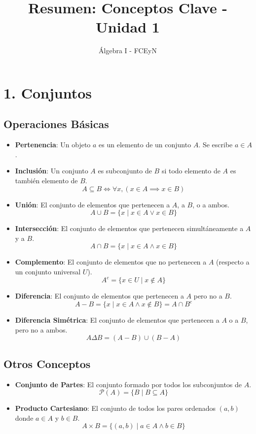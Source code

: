 \documentclass{article}
\title{\textbf{Resumen: Conceptos Clave - Unidad 1}}
\author{Álgebra I - FCEyN}
\date{}
\begin{document}
\maketitle

\section*{1. Conjuntos}

\subsection*{Operaciones B\'{a}sicas}
\begin{itemize}
    \item \textbf{Pertenencia}: Un objeto $a$ es un elemento de un conjunto $A$. Se escribe $a \in A$.
    \item \textbf{Inclusi\'{o}n}: Un conjunto $A$ es subconjunto de $B$ si todo elemento de $A$ es tambi\'{e}n elemento de $B$.
    \[ A \subseteq B \iff \forall x, (x \in A \implies x \in B) \]
    \item \textbf{Uni\'{o}n}: El conjunto de elementos que pertenecen a $A$, a $B$, o a ambos.
    \[ A \cup B = \{x \mid x \in A \lor x \in B\} \]
    \item \textbf{Intersecci\'{o}n}: El conjunto de elementos que pertenecen simult\'{a}neamente a $A$ y a $B$.
    \[ A \cap B = \{x \mid x \in A \land x \in B\} \]
    \item \textbf{Complemento}: El conjunto de elementos que no pertenecen a $A$ (respecto a un conjunto universal $U$).
    \[ A^c = \{x \in U \mid x \notin A\} \]
    \item \textbf{Diferencia}: El conjunto de elementos que pertenecen a $A$ pero no a $B$.
    \[ A - B = \{x \mid x \in A \land x \notin B\} = A \cap B^c \]
    \item \textbf{Diferencia Sim\'{e}trica}: El conjunto de elementos que pertenecen a $A$ o a $B$, pero no a ambos.
    \[ A \Delta B = (A - B) \cup (B - A) \]
\end{itemize}

\subsection*{Otros Conceptos}
\begin{itemize}
    \item \textbf{Conjunto de Partes}: El conjunto formado por todos los subconjuntos de $A$.
    \[ \mathcal{P}(A) = \{B \mid B \subseteq A\} \]
    \item \textbf{Producto Cartesiano}: El conjunto de todos los pares ordenados $(a, b)$ donde $a \in A$ y $b \in B$.
    \[ A \times B = \{(a, b) \mid a \in A \land b \in B\} \]
\end{itemize}
\end{document}
